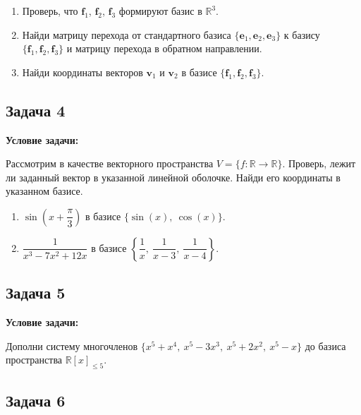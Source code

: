 \documentclass[a4paper,12pt]{article}
\begin{document}
\begin{enumerate}
    \item Проверь, что $\mathbf{f}_1$, $\mathbf{f}_2$, $\mathbf{f}_3$ формируют базис в $\mathbb{R}^3$.
    \item Найди матрицу перехода от стандартного базиса $\{\mathbf{e}_1, \mathbf{e}_2, \mathbf{e}_3\}$ к базису $\{\mathbf{f}_1, \mathbf{f}_2, \mathbf{f}_3\}$ и матрицу перехода в обратном направлении.
    \item Найди координаты векторов $\mathbf{v}_1$ и $\mathbf{v}_2$ в базисе $\{\mathbf{f}_1, \mathbf{f}_2, \mathbf{f}_3\}$.
\end{enumerate}

\vspace{0.5cm}

\subsection{Задача 4}

\textbf{Условие задачи:}

Рассмотрим в качестве векторного пространства $V = \{f : \mathbb{R} \rightarrow \mathbb{R}\}$. Проверь, лежит ли заданный вектор в указанной линейной оболочке. Найди его координаты в указанном базисе.

\begin{enumerate}
    \item $\sin\left(x + \dfrac{\pi}{3}\right)$ в базисе $\{\sin(x),\ \cos(x)\}$.
    \item $\dfrac{1}{x^3 - 7x^2 + 12x}$ в базисе $\left\{\dfrac{1}{x},\ \dfrac{1}{x - 3},\ \dfrac{1}{x - 4}\right\}$.
\end{enumerate}

\vspace{0.5cm}

\subsection{Задача 5}

\textbf{Условие задачи:}

Дополни систему многочленов $\{x^5 + x^4,\ x^5 - 3x^3,\ x^5 + 2x^2,\ x^5 - x\}$ до базиса пространства $\mathbb{R}[x]_{\leq 5}$.

\vspace{0.5cm}

\subsection{Задача 6}
\end{document}
